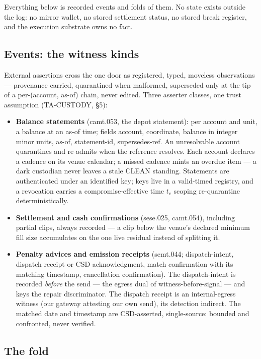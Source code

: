 \documentclass[11pt]{article}
\begin{document}
Everything below is recorded events and folds of them. No state exists outside the
log: no mirror wallet, no stored settlement status, no stored break register, and the
execution substrate owns no fact.

\subsection{Events: the witness kinds}

External assertions cross the one door as registered, typed, moveless observations
--- provenance carried, quarantined when malformed, superseded only at the tip of a
per-(account, as-of) chain, never edited. Three asserter classes, one trust
assumption (TA-CUSTODY, \S5):

\begin{itemize}
\item \textbf{Balance statements} (camt.053, the depot statement): per account and
unit, a balance at an as-of time; fields account, coordinate, balance in integer
minor units, as-of, statement-id, supersedes-ref. An unresolvable account
quarantines and re-admits when the reference resolves. Each account declares a
cadence on its venue calendar; a missed cadence mints an overdue item --- a dark
custodian never leaves a stale CLEAN standing. Statements are authenticated under
an identified key; keys live in a valid-timed registry, and a revocation carries a
compromise-effective time $t_c$ scoping re-quarantine deterministically.
\item \textbf{Settlement and cash confirmations} (sese.025, camt.054), including
partial clips, always recorded --- a clip below the venue's declared minimum fill
size accumulates on the one live residual instead of splitting it.
\item \textbf{Penalty advices and emission receipts} (semt.044; dispatch-intent,
dispatch receipt or CSD acknowledgment, match confirmation with its matching
timestamp, cancellation confirmation). The dispatch-intent is recorded
\emph{before} the send --- the egress dual of witness-before-signal --- and keys
the repair discriminator. The dispatch receipt is an internal-egress witness (our
gateway attesting our own send), its detection indirect. The matched date and
timestamp are CSD-asserted, single-source: bounded and confronted, never verified.
\end{itemize}

\subsection{The fold}
\end{document}

